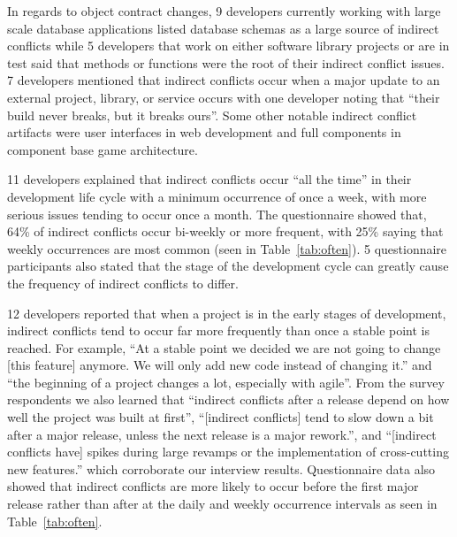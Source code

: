 \documentclass[conference]{IEEEtran}
\begin{document}
In regards to object contract changes, 9 developers currently working with large scale database applications listed database
schemas as a large source of indirect conflicts while 5 developers that work on either software
library projects or are in test said that methods or functions were the root of their indirect conflict issues.
7 developers mentioned that indirect conflicts occur when a major update to an external project,
library, or service occurs with one developer noting that ``their build never breaks, but it breaks ours''. Some
other notable indirect conflict artifacts were user interfaces in web development and full components in component
base game architecture.

11 developers explained that indirect conflicts occur ``all the time'' in
their development life cycle with a minimum occurrence of once a week, with more serious issues tending
to occur once a month. The questionnaire showed that, 64\% of indirect conflicts occur bi-weekly
or more frequent,
with 25\% saying that weekly occurrences are most common (seen in Table~\ref{tab:often}). 5 questionnaire participants
also stated that the stage of the development cycle can greatly cause the frequency of indirect conflicts to
differ.

12 developers reported that
when a project is in the early stages of development, indirect conflicts tend to occur far more frequently
than once a stable point is reached. For example, ``At a stable point we decided we are not going to change
[this feature] anymore. We will only add new code instead of changing it.'' and ``the beginning of a project
changes a lot, especially with agile''. From the survey respondents we also learned that ``indirect conflicts after a release
depend on how well the project was built at first'', ``[indirect conflicts] tend to slow down a bit after a
major release, unless the next release is a major rework.'', and ``[indirect conflicts have] spikes during
large revamps or the implementation of cross-cutting new features.'' which corroborate our interview results.
Questionnaire data also showed that
indirect conflicts are more likely to occur before the first major release rather than after at the daily
and weekly occurrence intervals as seen in Table~\ref{tab:often}.
\end{document}
